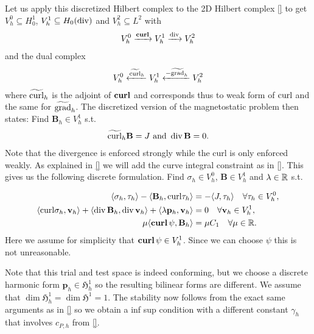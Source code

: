 \documentclass[../master_thesis.tex]{subfiles}
\begin{document}
Let us apply this discretized Hilbert complex to the 2D Hilbert complex \ref{}
to get $V^0_h \subseteq H^1_0$, $V^1_h \subseteq H_0(\operatorname{div})$ and $V^2_h \subseteq L^2$
with 
\begin{align*}
    V^0_h \xrightarrow{\veccurl} V^1_h \xrightarrow{\diver} V^2_h
\end{align*}
and the dual complex 
\begin{align*}
    V^0_h \xleftarrow{\widetilde{\operatorname{curl}}_h} V^1_h \xleftarrow{-\widetilde{\operatorname{grad}}_h} V^2_h
\end{align*}
where $\widetilde{\operatorname{curl}}_h$ is the adjoint of $\veccurl$ and corresponds thus to
weak form of $\operatorname{curl}$ and the same for $\widetilde{\operatorname{grad}}_h$.
The discretized version of the magnetostatic problem then states: 
Find $\mathbf{B}_h \in V_h^1$ s.t.
\begin{align*}
    \widetilde{\operatorname{curl}}_h \mathbf{B} = J \text{ and }
    \operatorname{div} \mathbf{B} = 0.
\end{align*}
Note that the divergence is enforced strongly while the curl is only enforced weakly.
As explained in \ref{} we will add the curve integral constraint as in \ref{}.
This gives us the following discrete formulation. Find 
$\sigma_h \in V_h^0$, $\mathbf{B} \in V_h^1$ and $\lambda \in \mathbb{R}$ s.t.

\begin{align*}
    \langle \sigma_h, \tau_h \rangle - \langle \mathbf{B}_h, \mathbf{\curl}\tau_h \rangle 
    &=  -\langle J, \tau_h \rangle \quad \forall \tau_h \in V_h^0, 
    \\ \langle \mathbf{\curl}\sigma_h, \mathbf{v}_h \rangle + \langle \diver \mathbf{B}_h, \diver \mathbf{v}_h \rangle 
    + \langle \lambda \mathbf{p}_h, \mathbf{v}_h \rangle 
    &= 0 \quad \forall \mathbf{v}_h \in V^1_h, 
    \\ \mu \langle \bm{\curl} \psi, \mathbf{B}_h \rangle &= \mu C_1 \quad \forall \mu \in \real.
\end{align*}
Here we assume for simplicity that $\veccurl \psi \in V_h^1$. Since 
we can choose $\psi$ this is not unreasonable. 

Note that this trial and test space is indeed conforming, but we choose a discrete harmonic form 
$\mathbf{p}_h \in \mathfrak{H}^1_h$ so the resulting bilinear forms are different. 
We assume that $\dim \mathfrak{H}^1_h = \dim \mathfrak{H}^1 = 1$.
The stability now follows from the exact same arguments as in \ref{} 
so we obtain a inf sup condition with a different constant $\gamma_h$ that involves 
$c_{P,h}$ from \ref{}. 
\end{document}
